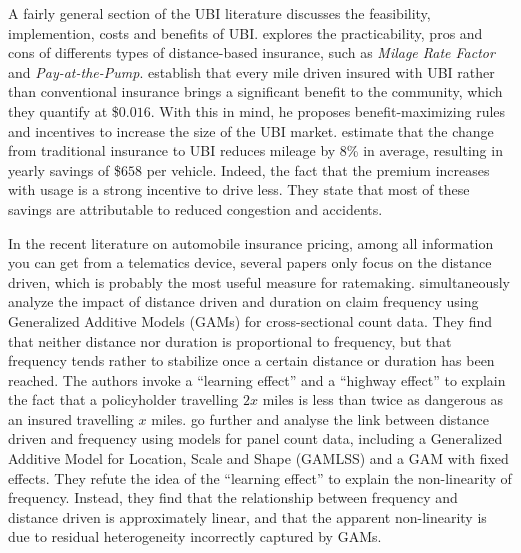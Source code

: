 \documentclass{article}
\begin{document}
A fairly general section of the UBI literature discusses the feasibility, implemention, costs and benefits of UBI. \cite{litman2007} explores the practicability, pros and cons of differents types of distance-based insurance, such as \textit{Milage Rate Factor} and \textit{Pay-at-the-Pump}. \cite{greenberg2009} establish that every mile driven insured with UBI rather than conventional insurance brings a significant benefit to the community, which they quantify at \$$0.016$. With this in mind, he proposes benefit-maximizing rules and incentives to increase the size of the UBI market. \cite{bordoff2008} estimate that the change from traditional insurance to UBI reduces mileage by $8$\% in average, resulting in yearly savings of \$$658$ per vehicle. Indeed, the fact that the premium increases with usage is a strong incentive to drive less. They state that most of these savings are attributable to reduced congestion and accidents. 

In the recent literature on automobile insurance pricing, among all information you can get from a telematics device, several papers only focus on the distance driven, which is probably the most useful measure for ratemaking. \cite{boucher2017exposure} simultaneously analyze the impact of distance driven and duration on claim frequency using Generalized Additive Models (GAMs) for cross-sectional count data. They find that neither distance nor duration is proportional to frequency, but that frequency tends rather to stabilize once a certain distance or duration has been reached. The authors invoke a ``learning effect'' and a ``highway effect'' to explain the fact that a policyholder travelling $2x$ miles is less than twice as dangerous as an insured travelling $x$ miles. \cite{boucher2020longitudinal} go further and analyse the link between distance driven and frequency using models for panel count data, including a Generalized Additive Model for Location, Scale and Shape (GAMLSS) and a GAM with fixed effects. They refute the idea of the ``learning effect'' to explain the non-linearity of frequency. Instead, they find that the relationship between frequency and distance driven is approximately linear, and that the apparent non-linearity is due to residual heterogeneity incorrectly captured by GAMs.
\end{document}
